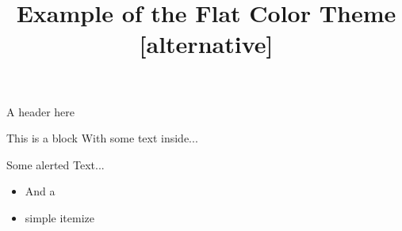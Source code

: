\documentclass[12pt,a4paper]{beamer}
\title{Example of the Flat Color Theme [alternative]}
\begin{document}
	\begin{frame}{}
		\maketitle
	\end{frame}
	\begin{frame}{A header here}
		\begin{block}{This is a block}
			With some text inside...
		\end{block}
		\alert{Some alerted Text...}
		\begin{itemize}
			\item And a
			\item simple itemize
		\end{itemize}
	\end{frame}
\end{document}
